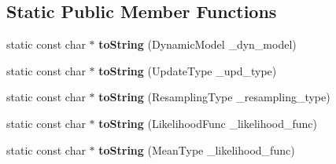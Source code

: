 \subsection*{Static Public Member Functions}
\begin{DoxyCompactItemize}
\item 
\hypertarget{structPFParams_a3e56b32818726b9c59a27c6b7af23a18}{static const char $\ast$ {\bfseries to\-String} (Dynamic\-Model \-\_\-dyn\-\_\-model)}\label{structPFParams_a3e56b32818726b9c59a27c6b7af23a18}

\item 
\hypertarget{structPFParams_adcca7e8769becce53131dee7cd56d5f4}{static const char $\ast$ {\bfseries to\-String} (Update\-Type \-\_\-upd\-\_\-type)}\label{structPFParams_adcca7e8769becce53131dee7cd56d5f4}

\item 
\hypertarget{structPFParams_ab60539384ce823a3d2a435c9c0c6b839}{static const char $\ast$ {\bfseries to\-String} (Resampling\-Type \-\_\-resampling\-\_\-type)}\label{structPFParams_ab60539384ce823a3d2a435c9c0c6b839}

\item 
\hypertarget{structPFParams_a52d032e75bb09b04ed056be2dfb46593}{static const char $\ast$ {\bfseries to\-String} (Likelihood\-Func \-\_\-likelihood\-\_\-func)}\label{structPFParams_a52d032e75bb09b04ed056be2dfb46593}

\item 
\hypertarget{structPFParams_a1a1bcfdf022e83555511dfd393ade48c}{static const char $\ast$ {\bfseries to\-String} (Mean\-Type \-\_\-likelihood\-\_\-func)}\label{structPFParams_a1a1bcfdf022e83555511dfd393ade48c}

\end{DoxyCompactItemize}
